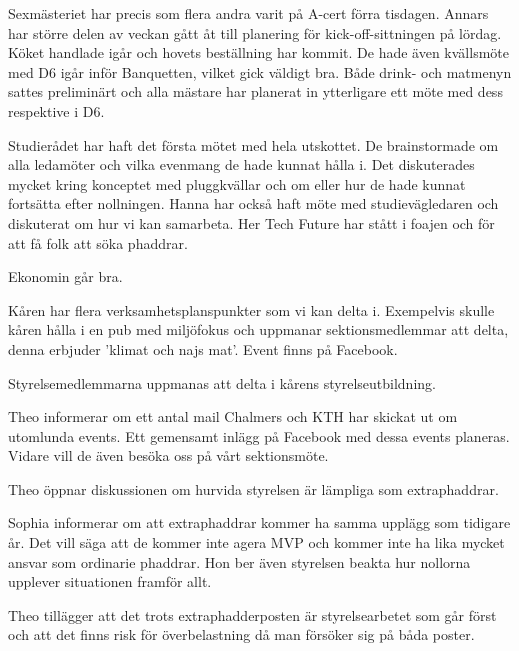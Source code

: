 \documentclass[10pt]{article}
\begin{document}
\begin{paragrafer}
\begin{paragrafer}
Sexmästeriet har precis som flera andra varit på A-cert förra tisdagen. Annars har större delen av veckan gått åt till planering för kick-off-sittningen på lördag. Köket handlade igår och hovets beställning har kommit. De hade även kvällsmöte med D6 igår inför Banquetten, vilket gick väldigt bra. Både drink- och matmenyn sattes preliminärt och alla mästare har planerat in ytterligare ett möte med dess respektive i D6.

Studierådet har haft det första mötet med hela utskottet. De brainstormade om alla ledamöter och vilka evenmang de hade kunnat hålla i. Det diskuterades mycket kring konceptet med pluggkvällar och om eller hur de hade kunnat fortsätta efter nollningen. Hanna har också haft möte med studievägledaren och diskuterat om hur vi kan samarbeta. Her Tech Future har stått i foajen och för att få folk att söka phaddrar. 

 
Ekonomin går bra.


Kåren har flera verksamhetsplanspunkter som vi kan delta i.
Exempelvis skulle kåren hålla i en pub med miljöfokus och uppmanar sektionsmedlemmar att delta, denna erbjuder 'klimat och najs mat'. Event finns på Facebook.

Styrelsemedlemmarna uppmanas att delta i kårens styrelseutbildning.


Theo informerar om ett antal mail Chalmers och KTH har skickat ut om utomlunda events. Ett gemensamt inlägg på Facebook med dessa events planeras. Vidare vill de även besöka oss på vårt sektionsmöte.

\end{paragrafer}


Theo öppnar diskussionen om hurvida styrelsen är lämpliga som extraphaddrar.

Sophia informerar om att extraphaddrar kommer ha samma upplägg som tidigare år. Det vill säga att de kommer inte agera MVP och kommer inte ha lika mycket ansvar som ordinarie phaddrar. Hon ber även styrelsen beakta hur nollorna upplever situationen framför allt.

Theo tillägger att det trots extraphadderposten är styrelsearbetet som går först och att det finns risk för överbelastning då man försöker sig på båda poster.


\end{paragrafer}
\end{document}
